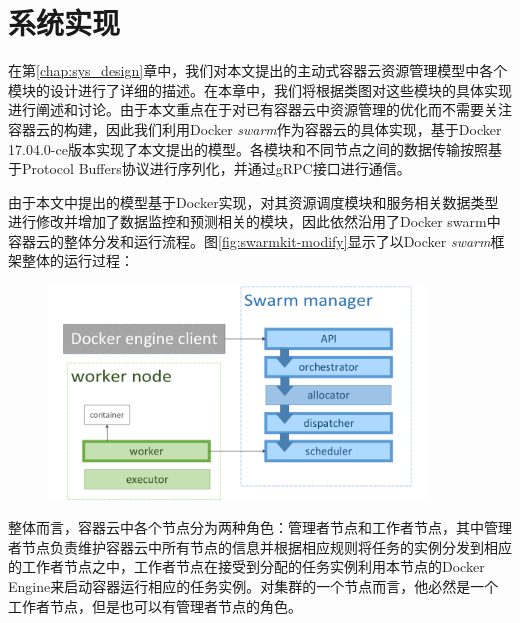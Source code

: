 
\chapter{系统实现}\label{chap:sys_impl}
在第\ref{chap:sys_design}章中，我们对本文提出的主动式容器云资源管理模型中各个模块的设计进行了详细的描述。在本章中，我们将根据类图对这些模块的具体实现进行阐述和讨论。由于本文重点在于对已有容器云中资源管理的优化而不需要关注容器云的构建，因此我们利用Docker \emph{swarm}作为容器云的具体实现，基于Docker 17.04.0-ce版本实现了本文提出的模型。各模块和不同节点之间的数据传输按照基于Protocol Buffers协议进行序列化，并通过gRPC接口进行通信。

由于本文中提出的模型基于Docker实现，对其资源调度模块和服务相关数据类型进行修改并增加了数据监控和预测相关的模块，因此依然沿用了Docker swarm中容器云的整体分发和运行流程。图\ref{fig:swarmkit-modify}显示了以Docker \emph{swarm}框架整体的运行过程：
\begin{figure}[htbp]
\centering
\includegraphics[width=0.9\textwidth]{./figure/modification}
\end{figure} 

整体而言，容器云中各个节点分为两种角色：管理者节点和工作者节点，其中管理者节点负责维护容器云中所有节点的信息并根据相应规则将任务的实例分发到相应的工作者节点之中，工作者节点在接受到分配的任务实例利用本节点的Docker Engine来启动容器运行相应的任务实例。对集群的一个节点而言，他必然是一个工作者节点，但是也可以有管理者节点的角色。

